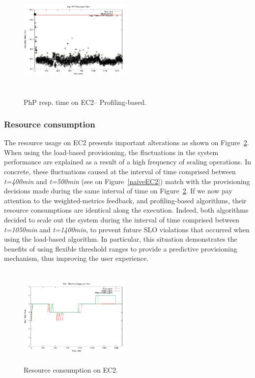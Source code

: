 \begin{figure}
\begin{center}
\includegraphics[width=0.49\textwidth, height=6cm]{./images/heterogeneous/avgTimeout_PhP_weightHistory}
\end{center}
\caption{ PhP resp. time on EC2-- Profiling-based.}
\label{historyWeightEC2}
\end{figure}

\subsubsection{Resource consumption}

The resource usage on EC2 presents important alterations as shown on Figure~\ref{resEC2}. When using the load-based provisioning, the fluctuations in the system performance are explained as a result of a high frequency of scaling operations. In concrete, these fluctuations caused at the interval of time comprised between \emph{t=400min} and \emph{t=500min} (see on Figure~\ref{naiveEC2}) match with the provisioning decisions made during the same interval of time on Figure~\ref{resEC2}. If we now pay attention to the weighted-metrics feedback, and profiling-based algorithms, their resource consumptions are identical along the execution. Indeed, both algorithms decided to scale out the system during the interval of time comprised between \emph{t=1050min} and \emph{t=1400min}, to prevent future SLO violations that occurred when using the load-based algorithm. In particular, this situation demonstrates the benefits of using flexible threshold ranges to provide a predictive provisioning mechanism, thus improving the user experience.


\begin{figure}
\begin{center}
\includegraphics[width=0.49\textwidth, height=5cm]{./images/heterogeneous/numMachinesCompEC2}
\end{center}
\caption{Resource consumption on EC2.}
\label{resEC2}
\end{figure}


